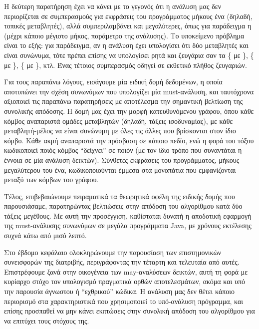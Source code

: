 Η δεύτερη παρατήρηση έχει να κάνει με το γεγονός ότι η ανάλυση μας δεν περιορίζεται σε συμπερασμούς για εκφράσεις του προγράμματος μήκους ένα (δηλαδή, τοπικές μεταβλητές), αλλά συμπεριλαμβάνει και μεγαλύτερες, όπως για παράδειγμα η {\en {}} (μέχρι κάποιο μέγιστο μήκος, παράμετρο της ανάλυσης). Το υποκείμενο πρόβλημα είναι το εξής: για παράδειγμα, αν η ανάλυση έχει υπολογίσει ότι δύο μεταβλητές {\en {}} και {\en {}} είναι συνώνυμα, τότε πρέπει επίσης να υπολογίσει ρητά και ζευγάρια σαν τα \{{\en {}} με {\en {}}\}, \{{\en {}} με {\en {}}\}, \{{\en {}} με {\en {}}\}, κτλ. Ένας τέτοιος συμπερασμός οδηγεί σε εκθετικό πλήθος ζευγαριών.

Για τους παραπάνω λόγους, εισάγουμε μία ειδική δομή δεδομένων, η οποία αποτυπώνει την σχέση συνωνύμων που υπολογίζει μία {\en must}-ανάλυση, και ταυτόχρονα αξιοποιεί τις παραπάνω παρατηρήσεις με αποτέλεσμα την σημαντική βελτίωση της συνολικής απόδοσης. Η δομή μας έχει την μορφή κατευθυνόμενου γράφου, όπου κάθε κόμβος αναπαριστά ομάδες μεταβλητών (δηλαδή, τάξεις ισοδυναμίας), με κάθε μεταβλητή-μέλος να είναι συνώνυμη με όλες τις άλλες που βρίσκονται στον ίδιο κόμβο. Κάθε ακμή αναπαριστά την πρόσβαση σε κάποιο πεδίο, ενώ η φορά του τόξου κωδικοποιεί ποιός κόμβος ``δείχνει'' σε ποιόν (με τον ίδιο τρόπο που συναντάται η έννοια σε μία ανάλυση δεικτών). Σύνθετες εκφράσεις του προγράμματος, μήκους μεγαλύτερου του ένα, κωδικοποιούνται έμμεσα στα μονοπάτια που εμφανίζονται μεταξύ των κόμβων του γράφου.

Τέλος, επιβεβαιώνουμε πειραματικά τα θεωρητικά οφέλη της ειδικής δομής που παρουσιάσαμε, παρατηρώντας βελτιώσεις στην απόδοση του αλγορίθμου κατά δύο τάξεις μεγέθους. Με αυτή την προσέγγιση, καθίσταται δυνατή η αποδοτική εφαρμογή της {\en must}-ανάλυσης συνωνύμων σε μεγάλα προγράμματα {\en Java}, με χρόνους εκτέλεσης συχνά κάτω από μισό λεπτό.


Στο έβδομο κεφάλαιο ολοκληρώνουμε την παρουσίαση των επιστημονικών συνεισφορών της διατριβής, περιγράφοντας την τέταρτη και τελευταία από αυτές. Επιστρέφουμε ξανά στην οικογένεια των {\en may}-αναλύσεων δεικτών, αυτή τη φορά με κυρίαρχο στόχο τον υπολογισμό πραγματικά ορθών αποτελεσμάτων, ακόμα και υπό την παρουσία άγνωστου ή ``εχθρικού'' κώδικα. Η ανάλυση μας δεν θέτει κάποιο περιορισμό στα χαρακτηριστικά που χρησιμοποιεί το υπό-ανάλυση πρόγραμμα, και επίσης προσπαθεί να μην κάνει εκπτώσεις στην συνολική απόδοση του αλγορίθμου για να επιτύχει τους στόχους της.


